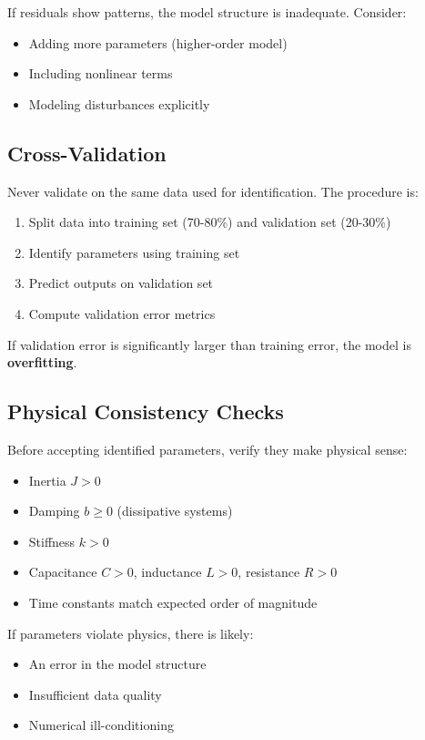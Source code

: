 If residuals show patterns, the model structure is inadequate. Consider:
\begin{itemize}
    \item Adding more parameters (higher-order model)
    \item Including nonlinear terms
    \item Modeling disturbances explicitly
\end{itemize}

\subsection{Cross-Validation}

Never validate on the same data used for identification. The procedure is:
\begin{enumerate}
    \item Split data into training set (70-80\%) and validation set (20-30\%)
    \item Identify parameters using training set
    \item Predict outputs on validation set
    \item Compute validation error metrics
\end{enumerate}

If validation error is significantly larger than training error, the model is \textbf{overfitting}.

\subsection{Physical Consistency Checks}

Before accepting identified parameters, verify they make physical sense:
\begin{itemize}
    \item Inertia $J > 0$
    \item Damping $b \geq 0$ (dissipative systems)
    \item Stiffness $k > 0$
    \item Capacitance $C > 0$, inductance $L > 0$, resistance $R > 0$
    \item Time constants match expected order of magnitude
\end{itemize}

If parameters violate physics, there is likely:
\begin{itemize}
    \item An error in the model structure
    \item Insufficient data quality
    \item Numerical ill-conditioning
\end{itemize}

